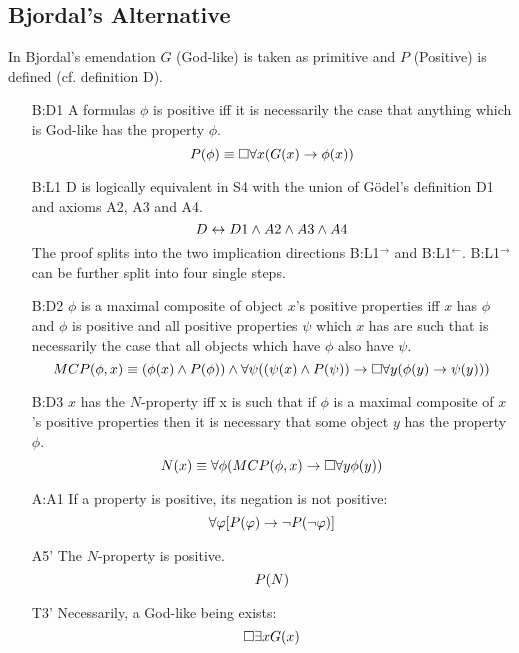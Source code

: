 \documentclass{birkjour}
\theoremstyle{definition}
\theoremstyle{remark}
\numberwithin{equation}{section}
\begin{document}
\begin{appendix}

\section{Bjordal's Alternative} \label{apx:Bjordal}

In Bjordal's emendation $G$ (God-like) is taken as primitive and $P$ (Positive) is defined (cf. definition D).
\begin{itemize}
\item[B:D1] A formulas $\phi$ is positive iff it is necessarily the case
  that anything which is God-like has the property $\phi$.
  $$P(\phi) \equiv \Box \forall x (G(x) \rightarrow \phi(x))$$ 
\item[B:L1] D is logically equivalent in S4 with the union of G\"odel's definition D1 and axioms A2, A3 and A4.
  $$D \leftrightarrow D1 \wedge A2 \wedge A3 \wedge A4$$
  The proof splits into the two implication directions B:L1$^\rightarrow$ and B:L1$^\leftarrow$. B:L1$^\rightarrow$ can be further split into four single steps.
\item[B:D2] $\phi$ is a maximal composite of object $x$'s positive properties iff $x$ has $\phi$ and $\phi$ is positive and all positive properties $\psi$ which $x$ has are such that is necessarily the case that all objects which have $\phi$ also have $\psi$.
  $$MCP(\phi,x) \equiv (\phi(x) \wedge P(\phi)) \wedge \forall \psi ((\psi(x) \wedge P(\psi)) \rightarrow \Box \forall y (\phi(y) \rightarrow \psi(y)))$$
\item[B:D3] $x$ has the $N$-property iff x is such that if $\phi$ is a maximal composite of $x$'s positive properties then it is necessary that some object $y$ has the property $\phi$.
  $$N(x) \equiv \forall \phi (MCP(\phi,x) \rightarrow \Box \forall y \phi(y))$$
\item[A:A1] If a property is positive, its negation is not positive:
  $$\forall \varphi [P(\varphi) \rightarrow \neg P(\neg \varphi)]$$ 
\item[A5'] The $N$-property is positive.
 $$P(N)$$
\item[T3'] Necessarily, a God-like being exists: $$\Box \exists x G(x)$$ 
\end{itemize}

\end{appendix}


\end{document}
